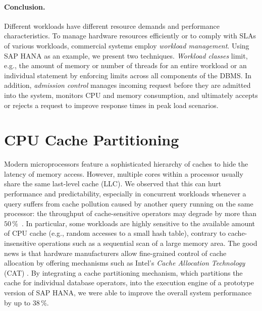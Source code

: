 \documentclass[11pt,dvipdfm]{article}
\begin{document}
\paragraph*{Conclusion.}
Different workloads have different resource demands and performance characteristics.
To manage hardware resources efficiently or to comply with SLAs of various workloads, commercial systems employ \emph{workload management}.
Using SAP HANA as an example, we present two techniques.
\emph{Workload classes} limit, e.g., the amount of memory or number of threads for an entire workload or an individual statement by enforcing limits across all components of the DBMS.
In addition, \emph{admission control} manages incoming request before they are admitted into the system, monitors CPU and memory consumption, and ultimately accepts or rejects a request to improve response times in peak load scenarios.



\section{CPU Cache Partitioning}
\label{nollhrm19:sec:cpu_cache_partitioning}

Modern microprocessors feature a sophisticated hierarchy of caches to hide the latency of memory access.
However, multiple cores within a processor usually share the same last-level cache (LLC).
We observed that this can hurt performance and predictability, especially in concurrent workloads whenever a query suffers from cache pollution caused by another query running on the same processor: the throughput of cache-sensitive operators may degrade by more than $50\,\mathrm{\%}$~\cite{nollhrm19:Noll:2018}.
In particular, some workloads are highly sensitive to the available amount of CPU cache (e.g., random accesses to a small hash table), contrary to cache-insensitive operations such as a sequential scan of a large memory area.
The good news is that hardware manufacturers allow fine-grained control of cache allocation by offering mechanisms such as Intel's \emph{Cache Allocation Technology} (CAT) \cite{nollhrm19:Intel:2015:CAT:whitepaper}.
By integrating a cache partitioning mechanism, which partitions the cache for individual database operators, into the execution engine of a prototype version of SAP HANA, we were able to improve the overall system performance by up to $38\,\mathrm{\%}$.
\end{document}
